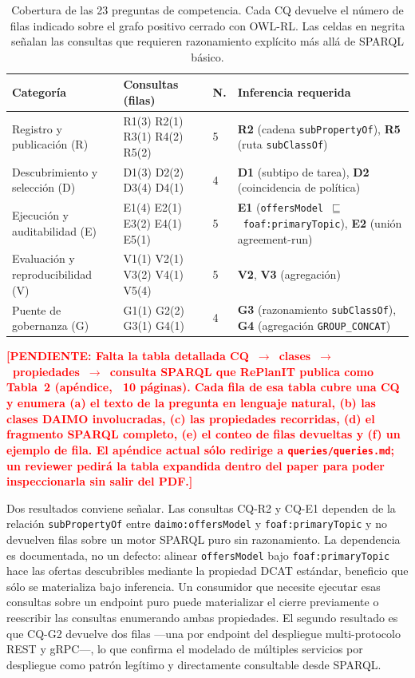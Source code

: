 \documentclass[Afour,sagev,times]{sagej}
\newcommand{\code}[1]{\texttt{#1}}
\newcommand{\TODO}[1]{\textcolor{red}{\textbf{[PENDIENTE: #1]}}}
\begin{document}
\begin{table}[t]
\small\sf\centering
\caption{Cobertura de las 23 preguntas de competencia. Cada CQ devuelve el número de filas indicado sobre el grafo positivo cerrado con OWL-RL. Las celdas en negrita señalan las consultas que requieren razonamiento explícito más allá de SPARQL básico.\label{tab:cqs}}
\begin{tabular}{@{}p{3.3cm}p{2.6cm}p{0.8cm}p{6.3cm}@{}}
\toprule
\textbf{Categoría} & \textbf{Consultas (filas)} & \textbf{N.} & \textbf{Inferencia requerida} \\
\midrule
Registro y publicación (R) & R1(3) R2(1) R3(1) R4(2) R5(2) & 5 & \textbf{R2} (cadena \code{subPropertyOf}), \textbf{R5} (ruta \code{subClassOf}) \\
Descubrimiento y selección (D) & D1(3) D2(2) D3(4) D4(1) & 4 & \textbf{D1} (subtipo de tarea), \textbf{D2} (coincidencia de política) \\
Ejecución y auditabilidad (E) & E1(4) E2(1) E3(2) E4(1) E5(1) & 5 & \textbf{E1} (\code{offersModel}~$\sqsubseteq$~\code{foaf:primaryTopic}), \textbf{E2} (unión agreement-run) \\
Evaluación y reproducibilidad (V) & V1(1) V2(1) V3(2) V4(1) V5(4) & 5 & \textbf{V2}, \textbf{V3} (agregación) \\
Puente de gobernanza (G) & G1(1) G2(2) G3(1) G4(1) & 4 & \textbf{G3} (razonamiento \code{subClassOf}), \textbf{G4} (agregación \code{GROUP\_CONCAT}) \\
\bottomrule
\end{tabular}
\end{table}

\TODO{Falta la tabla detallada CQ~$\to$~clases~$\to$~propiedades~$\to$~consulta SPARQL que RePlanIT publica como Tabla~2 (apéndice, ~10 páginas). Cada fila de esa tabla cubre una CQ y enumera (a) el texto de la pregunta en lenguaje natural, (b) las clases DAIMO involucradas, (c) las propiedades recorridas, (d) el fragmento SPARQL completo, (e) el conteo de filas devueltas y (f) un ejemplo de fila. El apéndice actual sólo redirige a \code{queries/queries.md}; un reviewer pedirá la tabla expandida dentro del paper para poder inspeccionarla sin salir del PDF.}

Dos resultados conviene señalar. Las consultas CQ-R2 y CQ-E1 dependen de la relación \code{subPropertyOf} entre \code{daimo:offersModel} y \code{foaf:primaryTopic} y no devuelven filas sobre un motor SPARQL puro sin razonamiento. La dependencia es documentada, no un defecto: alinear \code{offersModel} bajo \code{foaf:primaryTopic} hace las ofertas descubribles mediante la propiedad DCAT estándar, beneficio que sólo se materializa bajo inferencia. Un consumidor que necesite ejecutar esas consultas sobre un endpoint puro puede materializar el cierre previamente o reescribir las consultas enumerando ambas propiedades. El segundo resultado es que CQ-G2 devuelve dos filas ---una por endpoint del despliegue multi-protocolo REST y gRPC---, lo que confirma el modelado de múltiples servicios por despliegue como patrón legítimo y directamente consultable desde SPARQL.
\end{document}
